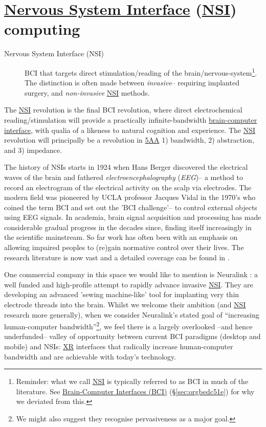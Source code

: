 \documentclass[logo,bsc,singlespacing,parskip]{infthesis}
\begin{document}
\section{\hyperref[org25c8a28]{Nervous System Interface} (\hyperref[orgbcfe20a]{NSI}) computing}
\label{sec:orgebda6bf}
\begin{mdframed}
\begin{description}
\item[{\label{org25c8a28}Nervous System Interface (\label{orgbcfe20a}NSI)}] BCI that targets direct stimulation/reading of the brain/nervous-system\footnote{Reminder: what we call \hyperref[orgbcfe20a]{NSI} is typically referred to as BCI in much of the literature. See \hyperref[sec:orgbedc51e]{Brain-Computer Interfaces (BCI)} (\S \ref{sec:orgbedc51e}) for why we deviated from this.}.
The distinction is often made between \emph{invasive}-- requiring implanted surgery, and \emph{non-invasive} \hyperref[orgbcfe20a]{NSI} methods.
\end{description}
\end{mdframed}

The \hyperref[orgbcfe20a]{NSI} revolution is the final BCI revolution, where direct electrochemical reading/stimulation will provide a practically infinite-bandwidth \hyperref[orgb0a773e]{brain-computer interface}, with qualia of a likeness to natural cognition and experience.
The \hyperref[orgbcfe20a]{NSI} revolution will principally be a revolution in \hyperref[orgce96c46]{5AA} 1) bandwidth, 2) abstraction, and 3) impedance.

The history of NSIs starts in 1924 when Hans Berger discovered the electrical waves of the brain and fathered \emph{electroencephalography} (\emph{EEG})--  a method to record an electrogram of the electrical activity on the scalp via electrodes.
The modern field was pioneered by UCLA professor Jacques Vidal in the 1970's who coined the term BCI and set out the 'BCI challenge'-- to control external objects using EEG signals.
In academia, brain signal acquisition and processing has made considerable gradual progress in the decades since, finding itself increasingly in the scientific mainstream.
So far work has often been with an emphasis on allowing impaired peoples to (re)gain normative control over their lives.
The research literature is now vast and a detailed coverage can be found in \autocite{kawala-sterniukSummaryFiftyYears2021}.

One commercial company in this space we would like to mention is Neuralink \autocite{muskNeuralink}: a well funded and high-profile attempt to rapidly advance invasive \hyperref[orgbcfe20a]{NSI}.
They are developing an advanced 'sewing machine-like' tool for implanting very thin electrode threads into the brain.
Whilst we welcome their ambition (and \hyperref[orgbcfe20a]{NSI} research more generally), when we consider Neuralink's stated goal of ``increasing human-computer bandwidth''\footnote{We might also suggest they recognise pervasiveness as a major goal.}, we feel there is a largely overlooked --and hence underfunded-- valley of opportunity between current BCI paradigms (desktop and mobile) and NSIs: \hyperref[org53dbe83]{XR} interfaces that radically increase human-computer bandwidth and are achievable with today's technology.
\end{document}
